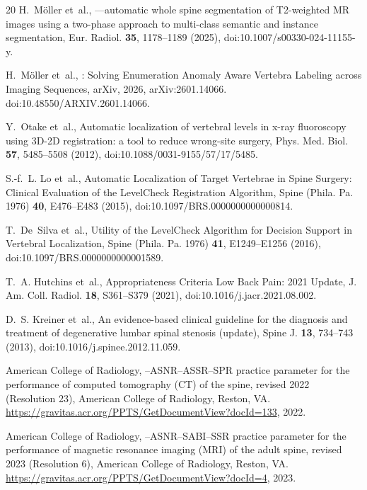 \documentclass[aapm,mph,amsmath,amssymb,reprint]{revtex4-2}
\begin{document}
\begin{thebibliography}{20}
H.~M{\"o}ller et~al.,
—automatic whole spine segmentation of {T2}-weighted {MR} images using a two-phase approach to multi-class semantic and instance segmentation,
\newblock Eur. Radiol. {\bf 35}, 1178--1189 (2025),
\newblock doi:10.1007/s00330-024-11155-y.

H.~M{\"o}ller et~al.,
: Solving Enumeration Anomaly Aware Vertebra Labeling across Imaging Sequences,
\newblock arXiv, 2026,
\newblock arXiv:2601.14066. doi:10.48550/ARXIV.2601.14066.

Y.~Otake et~al.,
\newblock Automatic localization of vertebral levels in x-ray fluoroscopy using {3D-2D} registration: a tool to reduce wrong-site surgery,
\newblock Phys. Med. Biol. {\bf 57}, 5485--5508 (2012),
\newblock doi:10.1088/0031-9155/57/17/5485.

S.-f.~L. Lo et~al.,
\newblock Automatic Localization of Target Vertebrae in Spine Surgery: Clinical Evaluation of the {LevelCheck} Registration Algorithm,
\newblock Spine (Phila. Pa. 1976) {\bf 40}, E476--E483 (2015),
\newblock doi:10.1097/BRS.0000000000000814.

T.~De~Silva et~al.,
\newblock Utility of the {LevelCheck} Algorithm for Decision Support in Vertebral Localization,
\newblock Spine (Phila. Pa. 1976) {\bf 41}, E1249--E1256 (2016),
\newblock doi:10.1097/BRS.0000000000001589.

T.~A. Hutchins et~al.,
 {Appropriateness Criteria} Low Back Pain: 2021 Update,
\newblock J. Am. Coll. Radiol. {\bf 18}, S361--S379 (2021),
\newblock doi:10.1016/j.jacr.2021.08.002.

D.~S. Kreiner et~al.,
\newblock An evidence-based clinical guideline for the diagnosis and treatment of degenerative lumbar spinal stenosis (update),
\newblock Spine J. {\bf 13}, 734--743 (2013),
\newblock doi:10.1016/j.spinee.2012.11.059.

{American College of Radiology},
--{ASNR}--{ASSR}--{SPR} practice parameter for the performance of computed tomography ({CT}) of the spine, revised 2022 ({Resolution} 23),
\newblock American College of Radiology, Reston, VA. \url{https://gravitas.acr.org/PPTS/GetDocumentView?docId=133}, 2022.

{American College of Radiology},
--{ASNR}--{SABI}--{SSR} practice parameter for the performance of magnetic resonance imaging ({MRI}) of the adult spine, revised 2023 ({Resolution} 6),
\newblock American College of Radiology, Reston, VA. \url{https://gravitas.acr.org/PPTS/GetDocumentView?docId=4}, 2023.


\end{thebibliography}
\end{document}
